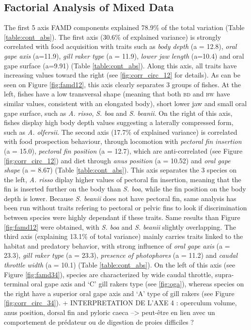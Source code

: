 
\subsection{Factorial Analysis of Mixed Data}

The first 5 axis FAMD components explained 78.9\% of the total variation (Table \ref{table:cont_abs}). The first axis (30.6\% of explained variance) is strongly correlated with food acquisition with traits such as \emph{body depth} (a = 12.8), \emph{oral gape axis} (a=11.9), \emph{gill raker type} (a = 11.9), \emph{lower jaw length} (a=10.4) and oral gape surface (a=9.91) (Table \ref{table:cont_abs}). Along this axis, all traits have increasing values toward the right (see \ref{fig:corr_circ_12} for details). As can be seen on Figure \ref{fig:famd12}, this axis clearly separates 3 groups of fishes. At the left, fishes have a low transversal shape (meaning that both \textsc{bd} and \textsc{bw} have similar values, consistent with an elongated body), short lower jaw and small oral gape surface, such as \textit{A. risso}, \textit{S. boa} and \textit{S. beanii}. On the right of this axis, fishes display high body depth values suggesting a laterally compressed form, such as \textit{A. olfersii}. 
The second axis (17.7\% of explained variance) is correlated with food prospection behaviour, through locomotion with \emph{pectoral fin insertion} (a = 15.0), \emph{pectoral fin position} (a = 12.7), which are anti-correlated (see Figure \ref{fig:corr_circ_12}) and diet through \emph{anus position} (a = 10.52) and \emph{oral gape shape} (a = 8.67) (Table \ref{table:cont_abs}). This axis separates the 3 species on the left, \textit{A. risso} diplay higher values of pectoral fin insertion, meaning that the fin is inserted further on the body than \textit{S. boa}, while the fin position on the body depth is lower. Because \textit{S. beanii} does not have pectoral fin, same analysis has been run without traits refering to pectoral or pelvic fins to look if discrimination between species were highly dependant if these traits. Same results than Figure \ref{fig:famd12} were obtained, with \textit{S. boa} and \textit{S. beanii} slightly overlapping. 
The third axis (explaining 13.1\% of total variance) mainly carries traits linked to the habitat and predatory behavior, with strong influence of \emph{oral gape axis} (a = 23.3), \emph{gill raker type} (a = 23.3), \emph{presence of photophores} (a = 11.2) and \emph{caudal throttle width} (a = 10.1) (Table \ref{table:cont_abs}). On the left of this axis (see Figure \ref{fig:famd34}), species are characterized by wide caudal throttle, supra-terminal oral gape axis and `C' gill rakers type (see \ref{fig:oga}), whereas species on the right have a superior oral gape axis and `A' type of gill rakers (see Figure \ref{fig:corr_circ_34}).
+ INTERPRETATION DE L'AXE 4 : operculum volume, anus position, dorsal fin and pyloric caeca --> peut-être en lien avec un comportement de prédateur ou de digestion de proies difficiles ?  

